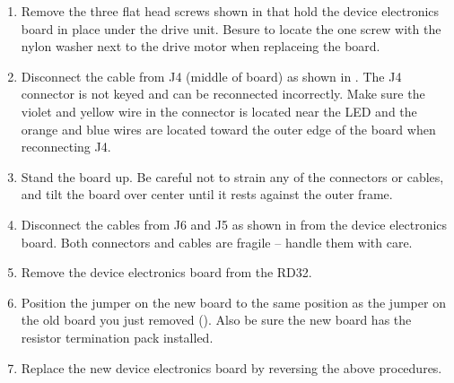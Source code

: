 
\begin{enumerate}
\item	Remove the three flat head screws shown in  that hold the
		device electronics board in place under the drive unit. Besure to locate
		the one screw with the nylon washer next to the drive motor when
		replaceing the board.

\newpage
\item	Disconnect the cable from J4 (middle of board) as shown in .
		The J4 connector is not keyed and can be reconnected incorrectly. Make
		sure the violet and yellow wire in the connector is located near the LED
		and the orange and blue wires are located toward the outer edge of the
		board when reconnecting J4.

\item	Stand the board up. Be careful not to strain any of the connectors or
		cables, and tilt the board over center until it rests against the outer
		frame.

\newpage
\item	Disconnect the cables from J6 and J5 as shown in  from
		the device electronics board. Both connectors and cables are fragile --
		handle them with care.


\item	Remove the device electronics board from the RD32.
\newpage

\item	Position the jumper on the new board to the same position as the jumper
		on the old board you just removed (). Also be sure the new
		board has the resistor termination pack installed.


\item	Replace the new device electronics board by reversing the above procedures.
\end{enumerate}

